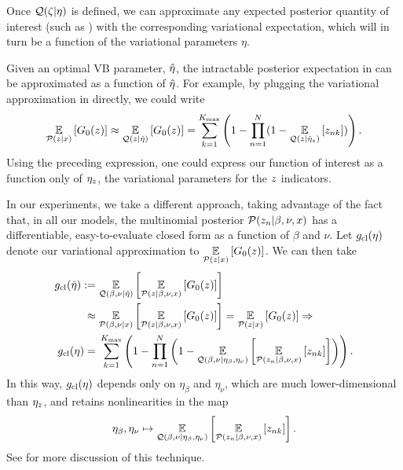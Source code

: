 Once $\mathcal{Q}(\zeta \vert \eta)$ is defined,
we can approximate any expected posterior quantity of interest
(such as ) with the
corresponding variational expectation, which will
in turn be a function of the variational parameters $\eta$.

\begin{ex}
%
Given an optimal VB parameter, $\hat\eta$, the intractable posterior expectation
in  can be approximated as a function of
$\hat\eta$.  For example, by plugging the variational approximation in directly,
we could write
%
\begin{align*}
%
\expect{\p(\z\vert\x)}{\nclusters_0(\z)} \approx
\expect{\q(\z\vert\etaopt)}{\nclusters_0(\z)} =
\sumk \left(1 -  \prod_{\n=1}^\N
    (1 - \expect{\q(\z \vert \etaoptz)}{\z_{\n\k}})\right).
%
\end{align*}
%
Using the preceding expression, one could express our function of interest as a
function only of $\eta_z$, the variational parameters for the $z$ indicators.

In our experiments, we take a different approach, taking advantage of the fact
that, in all our models, the multinomial posterior $\mathcal{P}(z_n \vert \beta, \nu,
x)$ has a differentiable, easy-to-evaluate closed form as a function of $\beta$
and $\nu$. Let $g_{\text{cl}}(\eta)$ denote our variational approximation to
$\underset{\mathcal{P}(z\vert x)}{\mathbb{E}}\left[G_0(z)\right]$.   We can then take
%
\begin{align*}
%
\gclustersabbr(\etaopt) :={}&
    \expect{\q(\beta, \nu \vert\etaopt)}{
        \expect{\p(\z \vert \beta, \nu, \x)}{\nclusters_0(\z)}
    }
\\\approx{}&
    \expect{\p(\beta, \nu \vert \x)}{
        \expect{\p(\z \vert \beta, \nu, \x)}{\nclusters_0(\z)}
    }
    = \expect{\p(\z\vert\x)}{\nclusters_0(\z)} \Rightarrow \\
%
\gclustersabbr(\eta) ={}&
    \sumk \left(1 -  \prod_{\n=1}^\N
        \left(1 - \expect{\q(\beta, \nu \vert \eta_\beta, \eta_\nu)}
                    {\expect{\p(\z_{\n} \vert \beta, \nu, \x)}{\z_{\n\k}}}
                    \right)\right).
%
\end{align*}
%
In this way, $g_{\text{cl}}(\eta)$ depends only on $\eta_\beta$ and $\eta_\nu$,
which are much lower-dimensional than $\eta_z$, and retains nonlinearities in
the map
%
\begin{align*}
%
\eta_\beta, \eta_\nu \mapsto \expect{\q(\beta, \nu \vert \eta_\beta,
\eta_\nu)} {\expect{\p(\z_{\n} \vert \beta, \nu, \x)}{\z_{\n\k}}}.
%
\end{align*}
%
See  for more discussion of this technique.
%
\end{ex}
